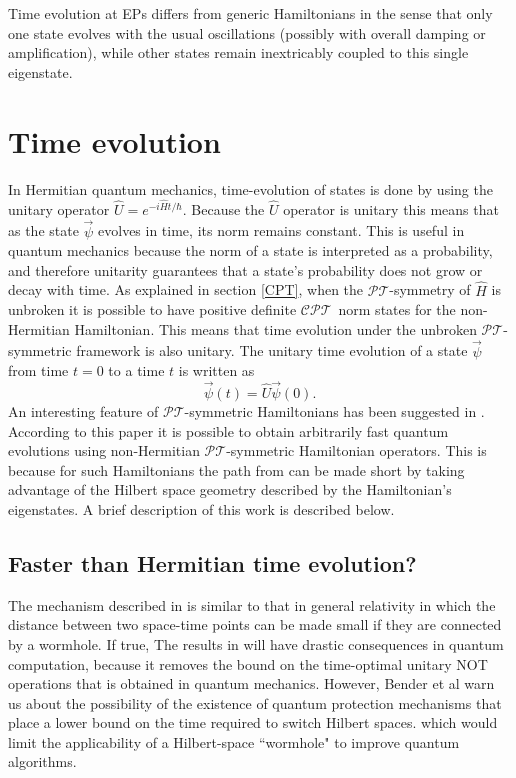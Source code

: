 \documentclass[12pt, a4paper]{report}
\newcommand\PT{\(\mathcal{PT}\)}
\newcommand\CPT{\(\mathcal{CPT}\)}
\begin{document}
Time evolution at EPs differs from generic Hamiltonians in the sense that only one state evolves with the usual oscillations (possibly with overall damping or amplification), while other states remain inextricably coupled to this single eigenstate\cite{Bossart}. 

\chapter{Time evolution}\label{TEv}
In Hermitian quantum mechanics, time-evolution of states is done by using the unitary operator $\hat{U} = e^{-i\hat{H}t/\hbar}$. Because the $\hat{U}$ operator is unitary this means that as the state $\vec{\psi}$ evolves in time, its norm remains constant. This is useful in quantum mechanics because the norm of a state is interpreted as a probability, and therefore unitarity guarantees that a state's probability does not grow or decay with time. As explained in section \ref{CPT}, when the \PT-symmetry of $\hat{H}$ is unbroken it is possible to have positive definite \CPT norm states for the non-Hermitian Hamiltonian. This means that time evolution under the unbroken \PT-symmetric framework is also unitary\cite{Jones-Smith}\cite{ComplexExtension}\cite{Mostafazadeh2}. 
The unitary time evolution of a state $\vec{\psi}$ from time $t = 0$ to a time $t$ is written as
\begin{equation}\label{eq:4.1}
\vec{\psi}(t) = \hat{U} \vec{\psi}(0).
\end{equation}
An interesting feature of \PT-symmetric Hamiltonians has been suggested in \cite{Bender_2007}. According to this paper it is possible to obtain arbitrarily fast quantum evolutions using non-Hermitian \PT-symmetric Hamiltonian operators. This is because for such Hamiltonians the path from can be made short by taking advantage of the Hilbert space geometry described by the Hamiltonian's eigenstates.
A brief description of this work is described below.

\section{Faster than Hermitian time evolution?}\label{faster}
The mechanism described in \cite{Bender_2007} is similar to that in general relativity in which the distance between two space-time points can be made small if they are connected by a wormhole. If true, The results in \cite{Bender_2007} will have drastic consequences in quantum computation, because it removes the bound on the time-optimal unitary NOT operations\cite{OptimalControl} that is obtained in quantum mechanics\cite{Brachistochrone_Mostafazadeh}. However, Bender et al warn us about the possibility of the existence of quantum protection mechanisms that place a lower bound on the time required to switch Hilbert spaces. which would limit the applicability of a Hilbert-space ``wormhole" to improve quantum algorithms\cite{Bender_2007}. 
\end{document}
